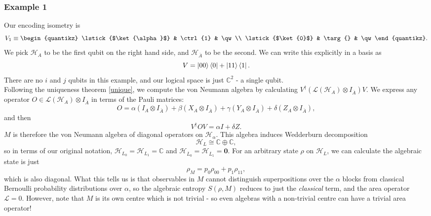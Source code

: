 \documentclass[12pt,a4paper]{report}
\numberwithin{equation}{section}
\newcommand{\ketbra}[2]{\ket{#1}\bra{#2}}
\newcommand{\ol}[1]{\overline{#1}}
\theoremstyle{definition}
\theoremstyle{theorem}
\theoremstyle{theorem}
\theoremstyle{example}
\theoremstyle{definition}
\begin{document}
\subsubsection{Example 1}
Our encoding isometry is
\begin{equation}
	V_{1}\equiv
			\begin{quantikz}
			\lstick{$\ket{\alpha}$} & \ctrl{1} & \qw\\
			\lstick{$\ket{0}$} & \targ{} & \qw
			\end{quantikz}.
\end{equation}
We pick $\mathcal{H}_{A}$ to be the first qubit on the right hand side, and $\mathcal{H}_{\ol{A}}$ to be the second. We can write this explicitly in a basis as
\begin{equation}
	V=\ketbra{00}{0}+\ketbra{11}{1}.
\end{equation}
There are no $i$ and $j$ qubits in this example, and our logical space is just $\mathbb{C}^{2}$ - a single qubit.\\
Following the uniqueness theorem \ref{unique}, we compute the von Neumann algebra by calculating $V^{\dagger}(\mathcal{L}(\mathcal{H}_{A})\otimes I_{\ol{A}})V$. We express any operator $O\in\mathcal{L}(\mathcal{H}_{A})\otimes I_{\ol{A}}$ in terms of the Pauli matrices:
\begin{equation}
	O=\alpha(I_{A}\otimes I_{\ol{A}})+\beta(X_{A}\otimes I_{\ol{A}})+\gamma(Y_{A}\otimes I_{\ol{A}})+\delta(Z_{A}\otimes I_{\ol{A}}),
\end{equation}
and then
\begin{equation}
	V^{\dagger}OV=\alpha I+\delta Z.
\end{equation}
$M$ is therefore the von Neumann algebra of diagonal operators on $\mathcal{H}_{\alpha}$. This algebra induces Wedderburn decomposition 
\begin{equation}
	\mathcal{H}_{L}\cong \mathbb{C}\oplus\mathbb{C},
\end{equation}
so in terms of our original notation, $\mathcal{H}_{L_{0}}=\mathcal{H}_{L_{1}}=\mathbb{C}$ and $\mathcal{H}_{\ol{L}_{0}}=\mathcal{H}_{\ol{L}_{1}}=\boldsymbol{0}$. For an arbitrary state $\rho$ on $\mathcal{H}_{L}$, we can calculate the algebraic state is just
\begin{equation}
	\rho_{M}=p_{0}\rho_{00}+p_{1}\rho_{11},
\end{equation}
which is also diagonal. What this tells us is that observables in $M$ cannot distinguish superpositions over the $\alpha$ blocks from classical Bernoulli probability distributions over $\alpha$, so the algebraic entropy $S(\rho,M)$ reduces to just the \textit{classical} term, and the area operator $\mathcal{L}=0$. However, note that $M$ is its own centre which is not trivial - so even algebras with a non-trivial centre can have a trivial area operator!
\end{document}
